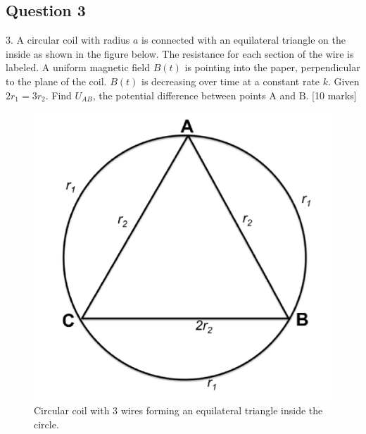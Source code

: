 \documentclass{article}
\begin{document}
\subsection{Question 3}
3. A circular coil with radius $a$ is connected with an equilateral triangle on the inside as shown in the figure below. The resistance for each section of the wire is labeled. A uniform magnetic field $B(t)$ is pointing into the paper, perpendicular to the plane of the coil. $B(t)$ is decreasing over time at a constant rate $k .$ Given $2 r_{1}=3 r_{2} .$ Find $U_{A B}$, the potential difference between points $\mathrm{A}$ and $\mathrm{B}$. [10 marks]
\begin{figure}
	\centering
	\includegraphics[width=0.5\linewidth]{spho_book_TYS_images/2016q3.png}
	\caption{Circular coil with 3 wires forming an equilateral triangle inside the circle.}
\end{figure}
\end{document}
